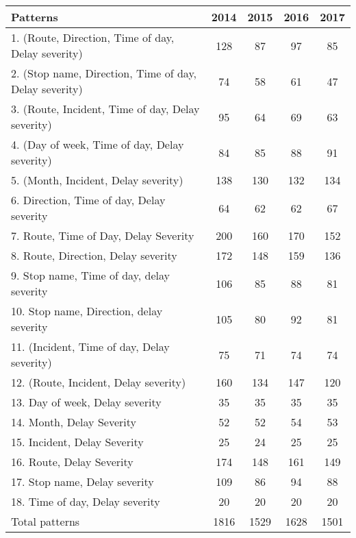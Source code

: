 \documentclass{article}
\begin{document}
\begin{table}
\begin{tabular}{|l|c|c|c|c|}
\hline
Patterns&2014&2015&2016&2017 \\ [0.5ex]
\hline
\hline
1. (Route, Direction, Time of day, Delay severity)&128&87&97&85 \\
\hline
2. (Stop name, Direction, Time of day, Delay severity)&74&58&61&47 \\
\hline
3. (Route, Incident, Time of day, Delay severity)&95&64&69&63 \\
\hline
4. (Day of week, Time of day, Delay severity)&84&85&88&91 \\
\hline
5. (Month, Incident, Delay severity)&138&130&132&134 \\
\hline
6. Direction, Time of day, Delay severity&64&62&62&67 \\
\hline
7. Route, Time of Day, Delay Severity&200&160&170&152 \\
\hline
8. Route, Direction, Delay severity&172&148&159&136 \\
\hline
9. Stop name, Time of day, delay severity&106&85&88&81 \\
\hline
10. Stop name, Direction, delay severity&105&80&92&81 \\
\hline
11. (Incident, Time of day, Delay severity)&75&71&74&74 \\
\hline
12. (Route, Incident, Delay severity)&160&134&147&120 \\
\hline
13. Day of week, Delay severity&35&35&35&35 \\
\hline
14. Month, Delay Severity&52&52&54&53 \\
\hline
15. Incident, Delay Severity&25&24&25&25 \\
\hline
16. Route, Delay Severity&174&148&161&149 \\
\hline
17. Stop name, Delay severity&109&86&94&88 \\
\hline
18. Time of day, Delay severity&20&20&20&20 \\ [0.5ex] 
\hline
\hline
Total patterns&1816&1529&1628&1501 \\
\hline
\end{tabular}
\end{table}

\newpage
\end{document}
